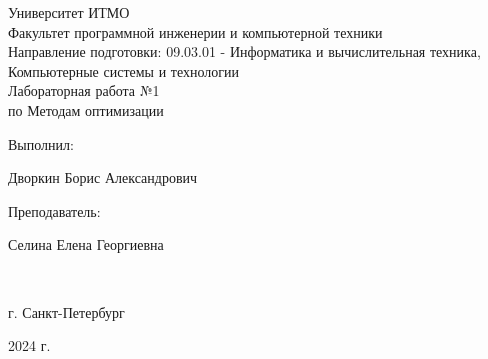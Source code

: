 \begin{center}
\hfill \break
\large{Университет ИТМО}\\
\large{Факультет программной инженерии и компьютерной техники}\\ 
\large{Направление подготовки: 09.03.01 - Информатика и вычислительная техника, Компьютерные системы и технологии}\\ 
\hfill\break
\hfill \break
\hfill \break
\hfill \break
\hfill \break
\hfill \break
\hfill \break
\hfill \break
\large{Лабораторная работа №1\\по Методам оптимизации\\}
\hfill \break
\hfill \break
\hfill \break
\hfill \break
\hfill \break
\end{center}
\hfill \break
\normalsize{ 
\begin{flushright}
Выполнил:
\par
Дворкин Борис Александрович
\par
Преподаватель:
\par
Селина Елена Георгиевна
\end{flushright}
}\\
\hfill \break
\hfill \break
\hfill \break
\hfill \break
\begin{center} г. Санкт-Петербург 
\par
2024 г. 
\end{center}
\thispagestyle{empty}
\thispagestyle{empty}